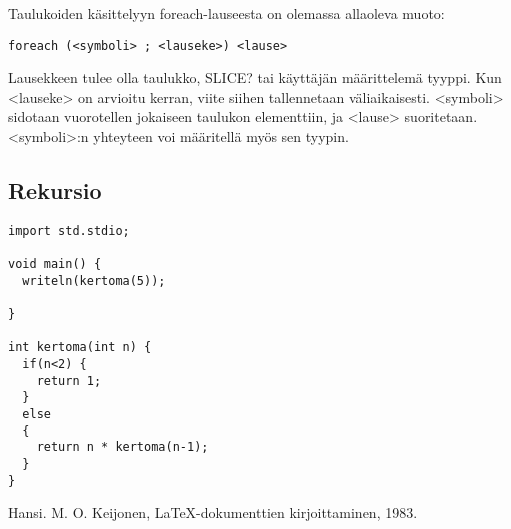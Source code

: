 \documentclass[11pt,oneside,a4paper]{article}
\begin{document}
Taulukoiden käsittelyyn foreach-lauseesta on olemassa allaoleva muoto:

\begin{verbatim}
foreach (<symboli> ; <lauseke>) <lause>
\end{verbatim}

Lausekkeen tulee olla taulukko, SLICE? tai käyttäjän määrittelemä tyyppi. Kun
<lauseke> on arvioitu kerran, viite siihen tallennetaan väliaikaisesti.
<symboli> sidotaan vuorotellen jokaiseen taulukon elementtiin, ja <lause>
suoritetaan. <symboli>:n yhteyteen voi määritellä myös sen tyypin. 

\subsection{Rekursio}

\begin{verbatim}
import std.stdio;

void main() {
  writeln(kertoma(5));

}

int kertoma(int n) {
  if(n<2) {
    return 1;
  }
  else
  {
    return n * kertoma(n-1);
  }
}
\end{verbatim}




\begin{thebibliography}{99}

 Hansi. M. O. Keijonen, LaTeX-dokumenttien kirjoittaminen, 1983.
\end{thebibliography}
\end{document}
